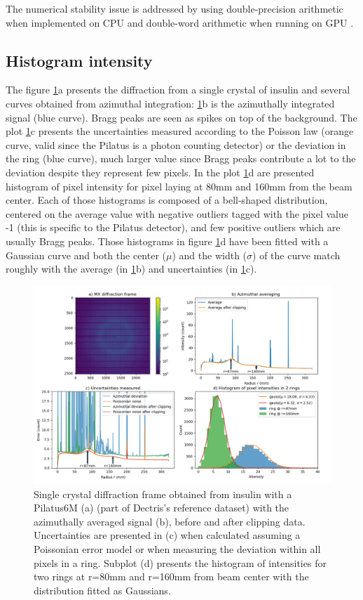 \documentclass[preprint]{iucr}              %
\begin{document}
The numerical stability issue is addressed by using double-precision arithmetic when implemented on CPU and double-word arithmetic when running on GPU \cite{double_word}.

\subsection{Histogram intensity }

The figure \ref{fig1}a presents the diffraction from a single crystal of insulin and several curves obtained from azimuthal integration: 
\ref{fig1}b is the azimuthally integrated signal (blue curve). Bragg peaks are seen as spikes on top of the background.
The plot \ref{fig1}c presents the uncertainties measured according to the Poisson law (orange curve, valid since the Pilatus is a photon counting detector) 
or the deviation in the ring (blue curve), much larger value since Bragg peaks contribute a lot to the deviation despite they represent few pixels.         
In the plot \ref{fig1}d are presented histogram of pixel intensity for  pixel laying at 80mm and 160mm from the beam center. 
Each of those histograms is composed of a bell-shaped distribution, centered on the average value with negative outliers tagged with the pixel value -1
(this is specific to the Pilatus detector), and few positive outliers which are usually Bragg peaks.   
Those histograms in figure \ref{fig1}d have been fitted with a Gaussian curve and both the center ($\mu$) and the width ($\sigma$) of the curve match 
roughly with the average (in \ref{fig1}b) and uncertainties (in \ref{fig1}c).  
\begin{figure}
\label{fig1}
\begin{center}
\includegraphics[width=14cm]{fig1}
\caption{Single crystal diffraction frame obtained from insulin with a Pilatus6M (a) (part of Dectris's reference dataset) with the azimuthally averaged signal (b), 
before and after clipping data. Uncertainties are presented in (c) when calculated assuming a Poissonian error model or when measuring the deviation within all pixels in a ring.
Subplot (d) presents the histogram of intensities for two rings at r=80mm and r=160mm from beam center with the distribution fitted as Gaussians.}
\end{center}
\end{figure}
\end{document}
